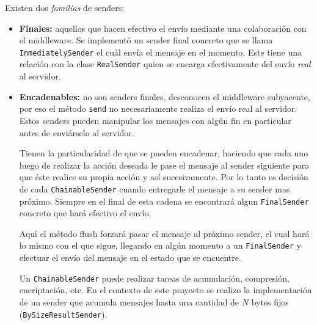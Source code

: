         Existen dos \textit{familias} de senders:
        \begin{itemize}
            \item \textbf{Finales:} aquellos que hacen efectivo el envío mediante una colaboración con el
                 middleware. Se implementó un sender final concreto que se llama \texttt{InmediatelySender} el
cuál envía el mensaje en el momento. Este tiene una relación con la clase \texttt{RealSender} quien se encarga
efectivamente del envío \textit{real} al servidor.
            \item \textbf{Encadenables:} no son senders finales, desconocen el middleware subyacente, por eso el
método \texttt{send} no necesariamente realiza el envío real al servidor. Estos senders pueden manipular los mensajes
con algún fin en particular antes de enviárselo al servidor.

Tienen la particularidad de que se pueden encadenar, haciendo
que cada uno luego de realizar la acción deseada le pase el mensaje al sender siguiente para que éste realice su propia
acción y así sucesivamente. Por lo tanto es decisión de cada \texttt{ChainableSender} cuando entregarle el mensaje a su
sender mas próximo. Siempre en el final de esta cadena se encontrará algun \texttt{FinalSender} concreto que hará
efectivo el envío.


     Aquí el método flush forzará pasar el mensaje al próximo sender, el cual hará lo mismo con el que sigue, llegando
en algún momento a un \texttt{FinalSender} y efectuar el envío del mensaje en el estado que se encuentre.


Un \texttt{ChainableSender} puede realizar tareas de acumulación, compresión, encriptación, etc. En el contexto de este
proyecto se realizo la implementación de un sender que acumula mensajes hasta una cantidad de $N$ bytes fijos
(\texttt{BySizeResultSender}).
                
        \end{itemize}
